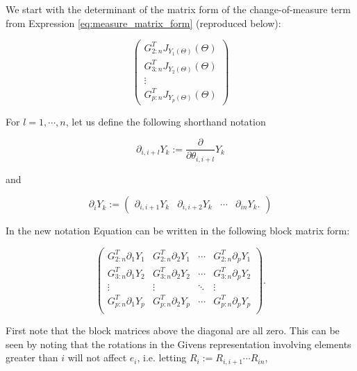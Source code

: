 \documentclass[ba]{imsart}
\numberwithin{equation}{section}
\theoremstyle{plain}
\begin{document}
\noindent We start with the determinant of the matrix form of the change-of-measure term from Expression \ref{eq:measure_matrix_form} (reproduced below):

\begin{equation}
\begin{pmatrix}
G_{2:n}^T J_{Y_1(\Theta)}(\Theta)\\
G_{3:n}^T J_{Y_2(\Theta)}(\Theta)\\
\vdots\\
G_{p:n}^T J_{Y_p(\Theta)}(\Theta)
\end{pmatrix}
\end{equation}

\noindent For $l = 1, \cdots, n$, let us define the following shorthand notation

\begin{equation}
\partial_{i,i+l} Y_k := \frac{\partial}{\partial \theta_{i,i+l}} Y_k
\end{equation}

\noindent and

\begin{equation}
\partial_{i} Y_k
:=
\begin{pmatrix}
\partial_{i,i+1} Y_k & \partial_{i,i+2} Y_k & \cdots & \partial_{in} Y_k.
\end{pmatrix}
\end{equation}

\noindent In the new notation Equation can be written in the following block matrix form:

\begin{equation}
\label{eq:matrix_blockform}
\begin{pmatrix}
G_{2:n}^T \partial_{1} Y_1 &G_{2:n}^T \partial_{2} Y_1 & \cdots & G_{2:n}^T \partial_{p} Y_1\\
G_{3:n}^T \partial_{1} Y_2 &G_{3:n}^T \partial_{2} Y_2 & \cdots & G_{3:n}^T \partial_{p} Y_2\\
\vdots & \vdots & \ddots & \vdots\\
G_{p:n}^T \partial_{1} Y_p &G_{p:n}^T \partial_{2} Y_p & \cdots & G_{p:n}^T \partial_{p} Y_p\\
\end{pmatrix}.
\end{equation}

\noindent First note that the block matrices above the diagonal are all zero.  This can be seen by noting that the rotations in the Givens representation involving elements greater than $i$ will not affect $e_i$, i.e. letting $R_i := R_{i,i+1} \cdots R_{in}$,
\end{document}
